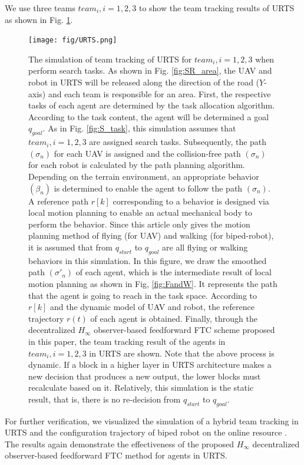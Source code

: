 \documentclass{ieeeaccess}
\begin{document}
We use three teams $team_i, i=1, 2, 3$ to show the team tracking results of URTS as shown in Fig. \ref{fig:URTS}.
\begin{figure}[htbp]
    \centering
    \texttt{[image: fig/URTS.png]}\caption{The simulation of team tracking of URTS for $team_i,i=1,2,3$ when perform search tasks. As shown in Fig. \ref{fig:SR_area}, the UAV and robot in URTS will be released along the direction of the road ($Y$-axis) and each team is responsible for an area. First, the respective tasks of each agent are determined by the task allocation algorithm. According to the task content, the agent will be determined a goal $q_{goal}$. As in Fig. \ref{fig:S_task}, this simulation assumes that $team_i,i=1,2,3$ are assigned search tasks. Subsequently, the path $(\sigma_n)$ for each UAV is assigned and the collision-free path $(\sigma_n)$ for each robot is calculated by the path planning algorithm. Depending on the terrain environment, an appropriate behavior $(\beta_n)$ is determined to enable the agent to follow the path $(\sigma_n)$. A reference path $r[k]$ corresponding to a behavior is designed via local motion planning to enable an actual mechanical body to perform the behavior. Since this article only gives the motion planning method of flying (for UAV) and walking (for biped-robot), it is assumed that from $q_{start}$ to $q_{goal}$ are all flying or walking behaviors in this simulation. In this figure, we draw the smoothed path $(\sigma'_n)$ of each agent, which is the intermediate result of local motion planning as shown in Fig, \ref{fig:FandW}. It represents the path that the agent is going to reach in the task space. According to $r[k]$ and the dynamic model of UAV and robot, the reference trajectory $r(t)$ of each agent is obtained. Finally, through the decentralized $H_\infty$ observer-based feedforward FTC scheme proposed in this paper, the team tracking result of the agents in $team_i, i=1,2,3$ in URTS are shown. Note that the above process is dynamic. If a block in a higher layer in URTS architecture makes a new decision that produces a new output, the lower blocks must recalculate based on it. Relatively, this simulation is the static result, that is, there is no re-decision from $q_{start}$ to $q_{goal}$.}
    \label{fig:URTS}
\end{figure}

For further verification, we visualized the simulation of a hybrid team tracking in URTS and the configuration trajectory of biped robot on the online resource \cite{mySimulation}. The results again demonstrate the effectiveness of the proposed $H_\infty$ decentralized observer-based feedforward FTC method for agents in URTS.
\end{document}
